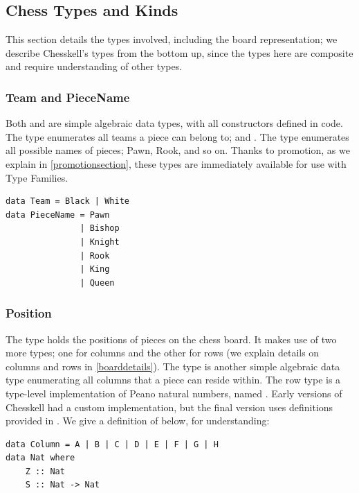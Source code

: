 \subsection{Chess Types and Kinds}

This section details the types involved, including the board representation; we describe Chesskell's types from the bottom up, since the types here are composite and require understanding of other types.

\subsubsection{Team and PieceName}

Both  and  are simple algebraic data types, with all constructors defined in code. The  type enumerates all teams a piece can belong to;  and . The  type enumerates all possible names of pieces; Pawn, Rook, and so on. Thanks to promotion, as we explain in \cref{promotionsection}, these types are immediately available for use with Type Families.

\begin{lstlisting}
data Team = Black | White
data PieceName = Pawn
               | Bishop
               | Knight
               | Rook
               | King
               | Queen
\end{lstlisting}

\subsubsection{Position}

The  type holds the positions of pieces on the chess board. It makes use of two more types; one for columns and the other for rows (we explain details on columns and rows in \cref{boarddetails}). The  type is another simple algebraic data type enumerating all columns that a piece can reside within. The row type is a type-level implementation of Peano natural numbers, named . Early versions of Chesskell had a custom implementation, but the final version uses definitions provided in . We give a definition of  below, for understanding:

\begin{lstlisting}
data Column = A | B | C | D | E | F | G | H
data Nat where
    Z :: Nat
    S :: Nat -> Nat
\end{lstlisting}

